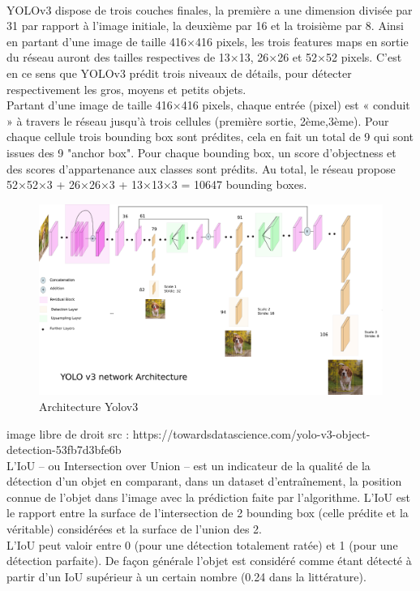 \documentclass[12pt,a4paper]{report}
\begin{document}
\begin{spacing}{1.5}
\\
YOLOv3 dispose de trois couches finales, la première a une dimension divisée par 31 par rapport à l’image initiale, la deuxième par 16 et la troisième par 8. Ainsi en partant d’une image de taille 416×416 pixels, les trois features maps en sortie du réseau auront des tailles respectives de 13×13, 26×26 et 52×52 pixels. C’est en ce sens que YOLOv3 prédit trois niveaux de détails, pour détecter respectivement les gros, moyens et petits objets.
\\
Partant d’une image de taille 416×416 pixels, chaque entrée (pixel) est « conduit » à travers le réseau jusqu'à trois cellules (première sortie, 2ème,3ème). Pour chaque cellule trois bounding box sont prédites, cela en fait un total de 9 qui sont issues des 9 "anchor box". Pour chaque bounding box, un score d’objectness et des scores d’appartenance aux classes sont prédits. Au total, le réseau propose 52×52×3 + 26×26×3 + 13×13×3 = 10647 bounding boxes.
\\
\begin{figure}[H]
\begin{center}
\includegraphics[scale=0.35]{figures/yolov3archi.png}
\caption{Architecture Yolov3}
\end{center}
\end{figure}
image libre de droit 
src : https://towardsdatascience.com/yolo-v3-object-detection-53fb7d3bfe6b
\\
L’IoU – ou Intersection over Union – est un indicateur de la qualité de la détection d’un objet en comparant, dans un dataset d’entraînement, la position connue de l’objet dans l’image avec la prédiction faite par l’algorithme. L’IoU est le rapport entre la surface de l’intersection de 2 bounding box (celle prédite et la véritable) considérées et la surface de l’union des 2.
\\
L’IoU peut valoir entre 0 (pour une détection totalement ratée) et 1 (pour une détection parfaite). De façon générale l’objet est considéré comme étant détecté à partir d’un IoU supérieur à un certain nombre (0.24  dans la littérature).


\end{spacing}
\end{document}

